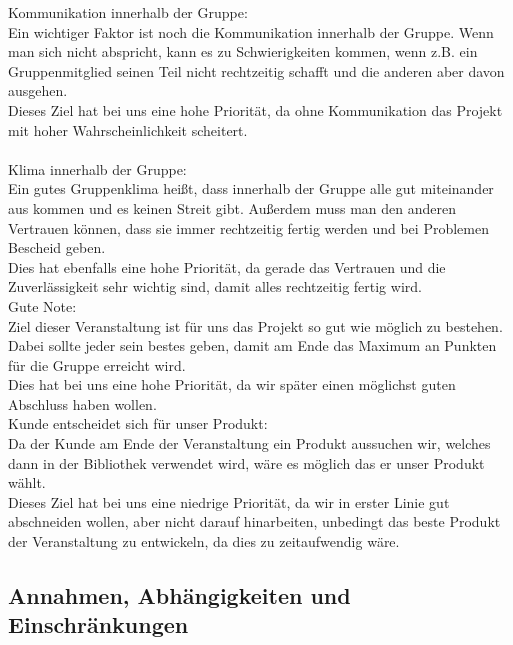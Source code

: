 \documentclass[fontsize=12pt,paper=a4,twoside]{scrartcl}
\begin{document}
Kommunikation innerhalb der Gruppe: \\
Ein wichtiger Faktor ist noch die Kommunikation innerhalb der Gruppe. Wenn man sich nicht abspricht, kann es zu Schwierigkeiten kommen, wenn z.B. ein Gruppenmitglied seinen Teil nicht rechtzeitig schafft und die anderen aber davon ausgehen.\\
Dieses Ziel hat bei uns eine hohe Priorität, da ohne Kommunikation das Projekt mit hoher Wahrscheinlichkeit scheitert.\\
\bigskip \\
Klima innerhalb der Gruppe: \\
Ein gutes Gruppenklima heißt, dass innerhalb der Gruppe alle gut miteinander aus kommen und es keinen Streit gibt. Außerdem muss man den anderen Vertrauen können, dass sie immer rechtzeitig fertig werden und bei Problemen Bescheid geben.\\
Dies hat ebenfalls eine hohe Priorität, da gerade das Vertrauen und die Zuverlässigkeit sehr wichtig sind, damit alles rechtzeitig fertig wird.
\bigskip \\
Gute Note:\\
Ziel dieser Veranstaltung ist für uns das Projekt so gut wie möglich zu bestehen. Dabei sollte jeder sein bestes geben, damit am Ende das Maximum an Punkten für die Gruppe erreicht wird.\\
Dies hat bei uns eine hohe Priorität, da wir später einen möglichst guten Abschluss haben wollen.
\bigskip \\
Kunde entscheidet sich für unser Produkt:\\
Da der Kunde am Ende der Veranstaltung ein Produkt aussuchen wir, welches dann in der Bibliothek verwendet wird, wäre es möglich das er unser Produkt wählt.\\
Dieses Ziel hat bei uns eine niedrige Priorität, da wir in erster Linie gut abschneiden wollen, aber nicht darauf hinarbeiten, unbedingt das beste Produkt der Veranstaltung zu entwickeln, da dies zu zeitaufwendig wäre.


\subsection{Annahmen, Abhängigkeiten und Einschränkungen}
\end{document}
